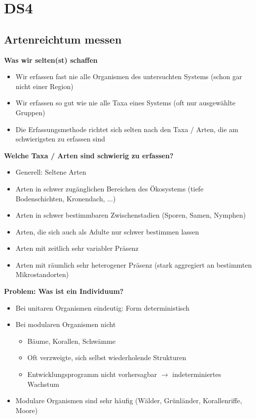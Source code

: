 \section{DS4}
\subsection{Artenreichtum messen}
\textbf{Was wir selten(st) schaffen}
\begin{itemize}
	\item Wir erfassen fast nie alle Organismen des untersuchten Systems (schon gar nicht einer Region)
	\item Wir erfassen so gut wie nie alle Taxa eines Systems (oft nur ausgewählte Gruppen)
	\item Die Erfassungsmethode richtet sich selten nach den Taxa / Arten, die am schwierigsten zu erfassen sind
\end{itemize}

\textbf{Welche Taxa / Arten sind schwierig zu erfassen?}
\begin{itemize}
	\item Generell: Seltene Arten
	\item Arten in schwer zugänglichen Bereichen des Ökosystems (tiefe Bodenschichten, Kronendach, ...)
	\item Arten in schwer bestimmbaren Zwischenstadien (Sporen, Samen, Nymphen)
	\item Arten, die sich auch als Adulte nur schwer bestimmen lassen
	\item Arten mit zeitlich sehr variabler Präsenz
	\item Arten mit räumlich sehr heterogener Präsenz (stark aggregiert an bestimmten Mikrostandorten)
\end{itemize}

\textbf{Problem: Was ist ein Individuum?}
\begin{itemize}
	\item Bei unitaren Organismen eindeutig: Form deterministisch
	\item Bei modularen Organismen nicht
	\begin{itemize}
		\item Bäume, Korallen, Schwämme
		\item Oft verzweigte, sich selbst wiederholende Strukturen
		\item Entwicklungsprogramm nicht vorhersagbar $\rightarrow$ indeterminiertes Wachstum
	\end{itemize}
	\item Modulare Organismen sind sehr häufig (Wälder, Grünländer, Korallenriffe, Moore)
\end{itemize}

